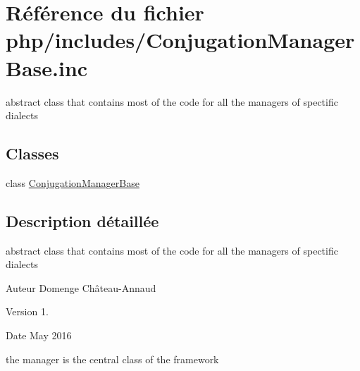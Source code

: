 \hypertarget{ConjugationManagerBase_8inc}{}\section{Référence du fichier php/includes/\+Conjugation\+Manager\+Base.inc}
\label{ConjugationManagerBase_8inc}


abstract class that contains most of the code for all the managers of spectific dialects  


\subsection*{Classes}
\begin{DoxyCompactItemize}
\item 
class \hyperlink{classConjugationManagerBase}{Conjugation\+Manager\+Base}
\end{DoxyCompactItemize}


\subsection{Description détaillée}
abstract class that contains most of the code for all the managers of spectific dialects 

\begin{DoxyAuthor}{Auteur}
Domenge Château-\/\+Annaud 
\end{DoxyAuthor}
\begin{DoxyVersion}{Version}
1. 
\end{DoxyVersion}
\begin{DoxyDate}{Date}
May 2016
\end{DoxyDate}
the manager is the central class of the framework 